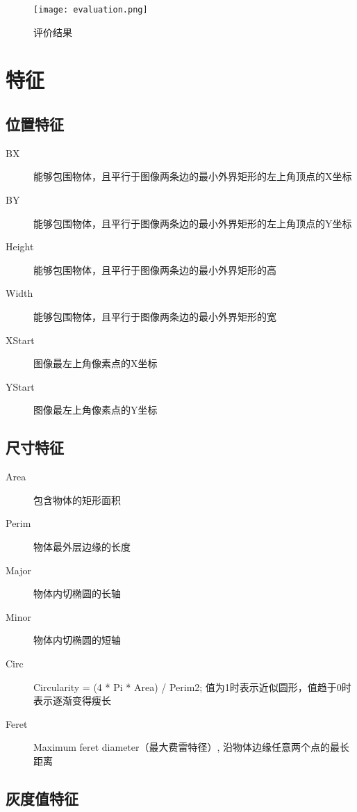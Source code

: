 \documentclass[12pt]{article}
\begin{document}
\begin{figure}[!ht]
\centering
\texttt{[image: evaluation.png]}
\caption{评价结果}
\label{fig: evaluation}
\end{figure} 

\section{特征}

\subsection{位置特征}

\begin{description}
\item[BX] 能够包围物体，且平行于图像两条边的最小外界矩形的左上角顶点的X坐标 
\item[BY] 能够包围物体，且平行于图像两条边的最小外界矩形的左上角顶点的Y坐标 
\item[Height] 能够包围物体，且平行于图像两条边的最小外界矩形的高
\item[Width] 能够包围物体，且平行于图像两条边的最小外界矩形的宽
\item[XStart] 图像最左上角像素点的X坐标
\item[YStart] 图像最左上角像素点的Y坐标
\end{description}

\subsection{尺寸特征}

\begin{description}
\item[Area] 包含物体的矩形面积 
\item[Perim] 物体最外层边缘的长度
\item[Major] 物体内切椭圆的长轴
\item[Minor] 物体内切椭圆的短轴
\item[Circ] Circularity = (4 * Pi * Area) / Perim2; 值为1时表示近似圆形，值趋于0时表示逐渐变得瘦长
\item[Feret] Maximum feret diameter（最大费雷特径）, 沿物体边缘任意两个点的最长距离
\end{description}

\subsection{灰度值特征}
\end{document}
